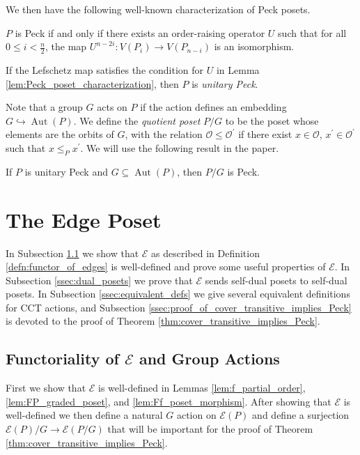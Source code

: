 \documentclass[smallextended]{svjour3}       %
\numberwithin{equation}{section}
\newcommand\ssec{\subsection}
\newcommand\Aut{\operatorname{Aut}}
\begin{document}
\noindent We then have the following well-known characterization of Peck posets.

\begin{lemma}\label{lem:Peck_poset_characterization}
$P$ is Peck if and only if there exists an order-raising operator $U$ such that for all $0\le i < \frac{n}{2}$, the map $U^{n-2i}\colon V(P_i)\rightarrow V(P_{n-i})$ is an isomorphism.
\end{lemma}

\begin{definition}
If the Lefschetz map satisfies the condition for $U$ in Lemma \ref{lem:Peck_poset_characterization}, then $P$ is \textit{unitary Peck}.
\end{definition}

Note that a group $G$ acts on $P$ if the action defines an embedding $G\hookrightarrow \Aut(P)$. We define the \textit{quotient poset} $P/G$ to be the poset whose elements are the orbits of $G$, with the relation $\mathcal{O}\le \mathcal{O}^\prime$ if there exist $x\in \mathcal{O}$, $x^\prime\in \mathcal{O}^\prime$ such that $x\le_{P} x^\prime$.  We will use the following result in the paper.

\begin{theorem}
\label{thm:quotients_of_unitary_peck_posets}
If $P$ is unitary Peck and $G\subseteq\Aut(P)$, then $P/G$ is Peck.
\end{theorem}



\section{The Edge Poset}
\label{sec:functor_of_edges}

In Subsection \ref{ssec:functoriality} we show that $\mathcal E$ as described in Definition \ref{defn:functor_of_edges} is well-defined and prove some useful properties of $\mathcal E$.  In Subsection \ref{ssec:dual_posets} we prove that $\mathcal{E}$ sends self-dual posets to self-dual posets.  In Subsection \ref{ssec:equivalent_defs} we give several equivalent definitions for CCT actions, and Subsection \ref{ssec:proof_of_cover_transitive_implies_Peck} is devoted to the proof of Theorem \ref{thm:cover_transitive_implies_Peck}.

\ssec{Functoriality of $\mathcal E$ and Group Actions}
\label{ssec:functoriality}
First we show that $\mathcal{E}$ is well-defined in Lemmas \ref{lem:f_partial_order}, \ref{lem:FP_graded_poset}, and \ref{lem:Ff_poset_morphism}.  After showing that $\mathcal E$ is well-defined we then define a natural $G$ action on $\mathcal E(P)$ and define a surjection $\mathcal E(P)/G\rightarrow \mathcal E(P/G)$ that will be important for the proof of Theorem \ref{thm:cover_transitive_implies_Peck}.
\end{document}
